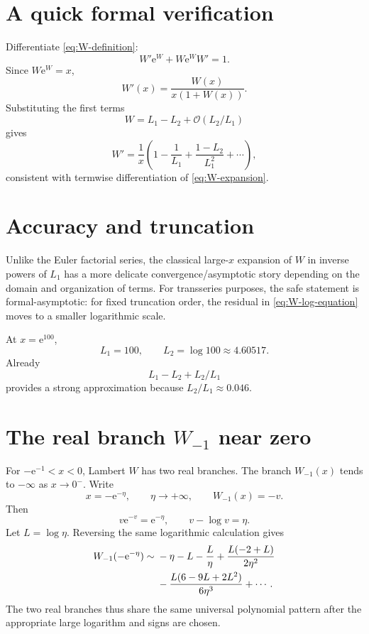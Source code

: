 \documentclass[11pt,openany]{book}
\theoremstyle{definition}
\theoremstyle{plain}
\theoremstyle{remark}
\newcommand{\e}{\mathrm{e}}
\newcommand{\bigO}{\mathcal{O}}
\newcommand{\asym}{\sim}
\begin{document}
\section{A quick formal verification}

Differentiate \cref{eq:W-definition}:
\[
 W'\e^W+W\e^W W'=1.
\]
Since $W\e^W=x$,
\begin{equation}\label{eq:W-derivative}
 W'(x)=\frac{W(x)}{x(1+W(x))}.
\end{equation}
Substituting the first terms
\[
 W=L_1-L_2+\bigO(L_2/L_1)
\]
gives
\[
 W'=\frac1x\left(1-\frac1{L_1}
 +\frac{1-L_2}{L_1^2}+\cdots\right),
\]
consistent with termwise differentiation of \cref{eq:W-expansion}.

\section{Accuracy and truncation}

Unlike the Euler factorial series, the classical large-$x$ expansion of $W$ in inverse powers of $L_1$ has a more delicate convergence/asymptotic story depending on the domain and organization of terms. For transseries purposes, the safe statement is formal-asymptotic: for fixed truncation order, the residual in \cref{eq:W-log-equation} moves to a smaller logarithmic scale.

At $x=\e^{100}$,
\[
 L_1=100,
 \qquad L_2=\log100\approx4.60517.
\]
Already
\[
 L_1-L_2+L_2/L_1
\]
provides a strong approximation because $L_2/L_1\approx0.046$.

\section{The real branch \texorpdfstring{$W_{-1}$}{W-1} near zero}

For $-\e^{-1}<x<0$, Lambert $W$ has two real branches. The branch $W_{-1}(x)$ tends to $-\infty$ as $x\to0^-$. Write
\[
 x=-\e^{-\eta},
 \qquad \eta\to+\infty,
 \qquad W_{-1}(x)=-v.
\]
Then
\[
 v\e^{-v}=\e^{-\eta},
 \qquad
 v-\log v=\eta.
\]
Let $L=\log\eta$. Reversing the same logarithmic calculation gives
\begin{align}\label{eq:Wminus1-expansion}
 W_{-1}(-\e^{-\eta})\asym{}&-\eta-L-\frac{L}{\eta}
 +\frac{L(-2+L)}{2\eta^2}\\
 &-\frac{L(6-9L+2L^2)}{6\eta^3}+\cdots.
\notag
\end{align}
The two real branches thus share the same universal polynomial pattern after the appropriate large logarithm and signs are chosen.
\end{document}
